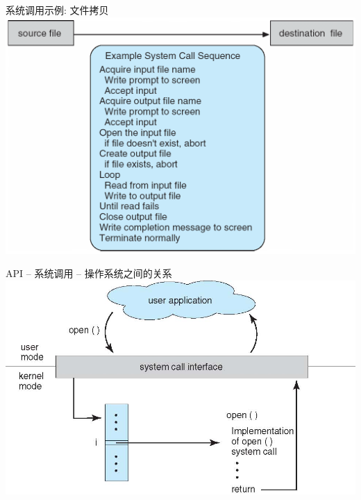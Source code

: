 \documentclass[xcolor=svgnames]{beamer}
\begin{document}
\begin{CJK*}{UTF8}{gbsn}
\begin{frame}{系统调用示例: 文件拷贝}
\includegraphics[width=1.0\textwidth]{syscall.png}
\end{frame}

\begin{frame}{API -- 系统调用 -- 操作系统之间的关系}
\includegraphics[width=1.0\textwidth]{syscall-os.jpg}
\end{frame}


\end{CJK*}
\end{document}
